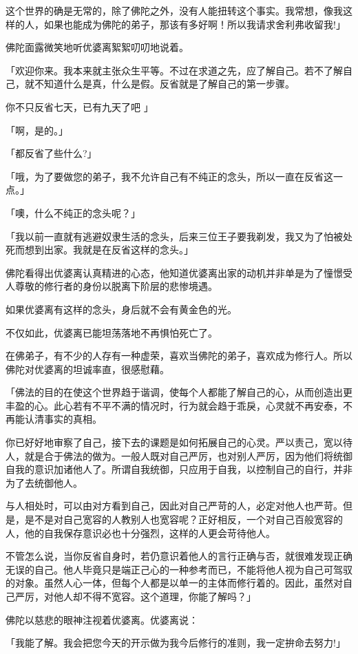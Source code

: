 \documentclass[twoside,openany]{book}
\begin{document}
这个世界的确是无常的，除了佛陀之外，没有人能扭转这个事实。我常想，像我这样的人，如果也能成为佛陀的弟子，那该有多好啊！所以我请求舍利弗收留我!」

佛陀面露微笑地听优婆离絮絮叨叨地说着。

「欢迎你来。我本来就主张众生平等。不过在求道之先，应了解自己。若不了解自己，就不知道什么是真，什么是假。反省就是了解自己的第一步骤。

你不只反省七天，已有九天了吧	」

「啊，是的。」

「都反省了些什么?」

「哦，为了要做您的弟子，我不允许自己有不纯正的念头，所以一直在反省这一点。」

「噢，什么不纯正的念头呢？」

「我以前一直就有逃避奴隶生活的念头，后来三位王子要我剃发，我又为了怕被处死而想到出家。我就是在反省这样的念头。」

佛陀看得出优婆离认真精进的心态，他知道优婆离出家的动机并非单是为了憧憬受人尊敬的修行者的身份以脱离下阶层的悲惨境遇。

如果优婆离有这样的念头，身后就不会有黄金色的光。

不仅如此，优婆离已能坦荡落地不再惧怕死亡了。

在佛弟子，有不少的人存有一种虚荣，喜欢当佛陀的弟子，喜欢成为修行人。所以佛陀对优婆离的坦诚率直，很感慰藉。

「佛法的目的在使这个世界趋于谐调，使每个人都能了解自己的心，从而创造出更丰盈的心。此心若有不平不满的情况时，行为就会趋于乖戾，心灵就不再安泰，不再能认清事实的真相。

你已好好地审察了自己，接下去的课题是如何拓展自己的心灵。严以责己，宽以待人，就是合于佛法的做为。一般人既对自己严厉，也对别人严厉，因为他们将统御自我的意识加诸他人了。所谓自我统御，只应用于自我，以控制自己的自行，并非为了去统御他人。

与人相处时，可以由对方看到自己，因此对自己严苛的人，必定对他人也严苛。但是，是不是对自己宽容的人教别人也宽容呢？正好相反，一个对自己百般宽容的人，他的自我保存意识必也十分强烈，这样的人更会苛待他人。

不管怎么说，当你反省自身时，若仍意识着他人的言行正确与否，就很难发现正确无误的自己。他人毕竟只是端正己心的一种参考而已，不能将他人视为自己可驾驭的对象。虽然人心一体，但每个人都是以单一的主体而修行着的。因此，虽然对自己严厉，对他人却不得不宽容。这个道理，你能了解吗？」

佛陀以慈悲的眼神注视着优婆离。优婆离说：

「我能了解。我会把您今天的开示做为我今后修行的准则，我一定拚命去努力!」
\end{document}
